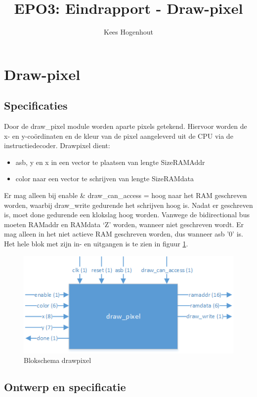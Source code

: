 \documentclass{scrartcl} %
\author{Kees Hogenhout}%
\title{EPO3: Eindrapport - Draw-pixel}
\begin{document}
\section{Draw-pixel} %
\label{sec:drawpixel} %

\subsection{Specificaties}
\label{ssec:specs_dp}
Door de draw\_pixel module worden aparte pixels getekend. Hiervoor worden de x- en y-coördinaten en de kleur van de pixel aangeleverd uit de CPU via de instructiedecoder.  Drawpixel dient: 
\begin{itemize}
\item asb, y en x in een vector te plaatsen van lengte SizeRAMAddr
\item color naar een vector te schrijven van lengte SizeRAMdata
\end{itemize}
  Er mag alleen bij enable \& draw\_can\_access = hoog naar het RAM geschreven worden, waarbij draw\_write gedurende het schrijven hoog is.  Nadat er geschreven is, moet done gedurende een klokslag hoog worden. Vanwege de bidirectional bus moeten RAMaddr en RAMdata `Z' worden, wanneer niet geschreven wordt. Er mag alleen in het niet actieve RAM geschreven worden, dus wanneer asb '0' is. Het hele blok met zijn in- en uitgangen is te zien in figuur  \ref{fig:dp_blokschema}. 
\begin{figure} [h!]
\centering
\includegraphics [width = \textwidth] {resource/dp_blokschema-rc}
\caption{Blokschema drawpixel}
\label{fig:dp_blokschema}
\end{figure}

\subsection{Ontwerp en specificatie}
\label{ssec:vhdl_dp}
\end{document}
